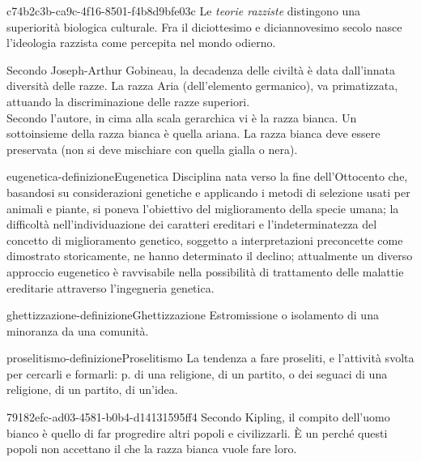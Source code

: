 \documentclass[preview]{standalone}
\begin{document}
\begin{snippet}{c74b2c3b-ca9c-4f16-8501-f4b8d9bfe03c}
    Le \textit{teorie razziste} distingono una superiorità biologica culturale.
    Fra il diciottesimo e diciannovesimo secolo nasce l'ideologia razzista come percepita nel mondo odierno.

    Secondo Joseph-Arthur Gobineau, la decadenza delle civiltà è data dall'innata
    diversità delle razze. La razza Aria (dell'elemento germanico),
    va primatizzata, attuando la discriminazione delle razze superiori.\\
    Secondo l'autore, in cima alla scala gerarchica vi è la razza bianca.
    Un sottoinsieme della razza bianca è quella ariana.
    La razza bianca deve essere preservata (non si deve mischiare con quella gialla o nera).
\end{snippet}

\begin{snippetdefinition}{eugenetica-definizione}{Eugenetica}
    Disciplina nata verso la fine dell'Ottocento che, basandosi su considerazioni genetiche e applicando i metodi di selezione usati per animali e piante, si poneva l'obiettivo del miglioramento della specie umana; la difficoltà nell'individuazione dei caratteri ereditari e l'indeterminatezza del concetto di miglioramento genetico, soggetto a interpretazioni preconcette come dimostrato storicamente, ne hanno determinato il declino; attualmente un diverso approccio eugenetico è ravvisabile nella possibilità di trattamento delle malattie ereditarie attraverso l'ingegneria genetica.
\end{snippetdefinition}

\begin{snippetdefinition}{ghettizzazione-definizione}{Ghettizzazione}
    Estromissione o isolamento di una minoranza da una comunità.
\end{snippetdefinition}

\begin{snippetdefinition}{proselitismo-definizione}{Proselitismo}
    La tendenza a fare proseliti, e l'attività svolta per cercarli e formarli: p. di una religione, di un partito, o dei seguaci di una religione, di un partito, di un'idea.
\end{snippetdefinition}

\begin{snippet}{79182efc-ad03-4581-b0b4-d14131595ff4}
    Secondo Kipling, il compito dell'uomo bianco è quello di far progredire
    altri popoli e civilizzarli. È un 
    perché questi popoli non accettano il  che la razza bianca vuole fare loro.
\end{snippet}
\end{document}
